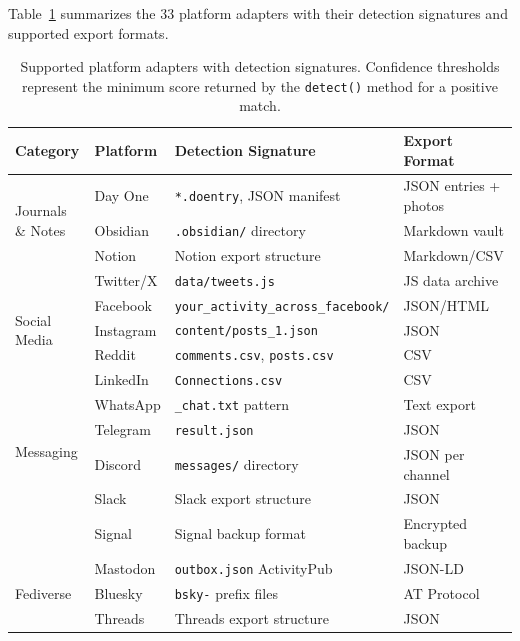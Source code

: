 \documentclass[manuscript,review]{acmart}
\begin{document}
Table~\ref{tab:adapters} summarizes the 33 platform adapters with their detection signatures and supported export formats.

\begin{table}[t]
\caption{Supported platform adapters with detection signatures. Confidence thresholds represent the minimum score returned by the \texttt{detect()} method for a positive match.}
\label{tab:adapters}
\small
\begin{tabular}{llll}
\toprule
\textbf{Category} & \textbf{Platform} & \textbf{Detection Signature} & \textbf{Export Format} \\
\midrule
\multirow{3}{*}{Journals \& Notes}
  & Day One        & \texttt{*.doentry}, JSON manifest & JSON entries + photos \\
  & Obsidian       & \texttt{.obsidian/} directory      & Markdown vault \\
  & Notion         & Notion export structure            & Markdown/CSV \\
\midrule
\multirow{5}{*}{Social Media}
  & Twitter/X      & \texttt{data/tweets.js}            & JS data archive \\
  & Facebook       & \texttt{your\_activity\_across\_facebook/} & JSON/HTML \\
  & Instagram      & \texttt{content/posts\_1.json}     & JSON \\
  & Reddit         & \texttt{comments.csv}, \texttt{posts.csv} & CSV \\
  & LinkedIn       & \texttt{Connections.csv}           & CSV \\
\midrule
\multirow{4}{*}{Messaging}
  & WhatsApp       & \texttt{\_chat.txt} pattern        & Text export \\
  & Telegram       & \texttt{result.json}               & JSON \\
  & Discord        & \texttt{messages/} directory        & JSON per channel \\
  & Slack          & Slack export structure              & JSON \\
  & Signal         & Signal backup format               & Encrypted backup \\
\midrule
\multirow{3}{*}{Fediverse}
  & Mastodon       & \texttt{outbox.json} ActivityPub   & JSON-LD \\
  & Bluesky        & \texttt{bsky-} prefix files        & AT Protocol \\
  & Threads        & Threads export structure            & JSON \\
\midrule

\end{tabular}
\end{table}
\end{document}
